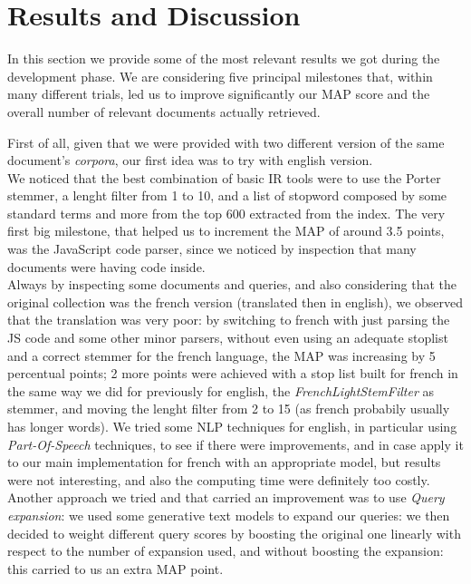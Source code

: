 \pagebreak
\section{Results and Discussion}
\label{sec:results}

In this section we provide some of the most relevant results we got during the development phase.
We are considering five principal milestones that, within many different trials, led us to improve significantly our MAP score and the overall number of relevant documents actually retrieved.



First of all, given that we were provided with two different version of the same document's \textit{corpora}, our first idea was to try with english version.\\ 
We noticed that the best combination of basic IR tools were to use the Porter stemmer, a lenght filter from 1 to 10, and a list of stopword composed by some standard terms and more from the top 600 extracted from the index.
The very first big milestone, that helped us to increment the MAP of around 3.5 points, was the JavaScript code parser, since we noticed by inspection that many documents were having code inside.\\
Always by inspecting some documents and queries, and also considering that the original collection was the french version (translated then in english), we observed that the translation was very poor: by switching to french
with just parsing the JS code and some other minor parsers, without even using an adequate stoplist and a correct stemmer for the french language, the MAP was increasing by 5 percentual points; 2 more points were achieved with
a stop list built for french in the same way we did for previously for english, the \textit{FrenchLightStemFilter} as stemmer, and moving the lenght filter from 2 to 15 (as french probabily usually has longer words).
We tried some NLP techniques for english, in particular using \textit{Part-Of-Speech} techniques, to see if there were improvements, and in case apply it to our main implementation for french with an appropriate model, but results 
were not interesting, and also the computing time were definitely too costly.
Another approach we tried and that carried an improvement was to use \textit{Query expansion}: we used some generative text models to expand our queries: we then decided to weight different query scores by boosting the original one linearly with respect to the number
of expansion used, and without boosting the expansion: this carried to us an extra MAP point.
